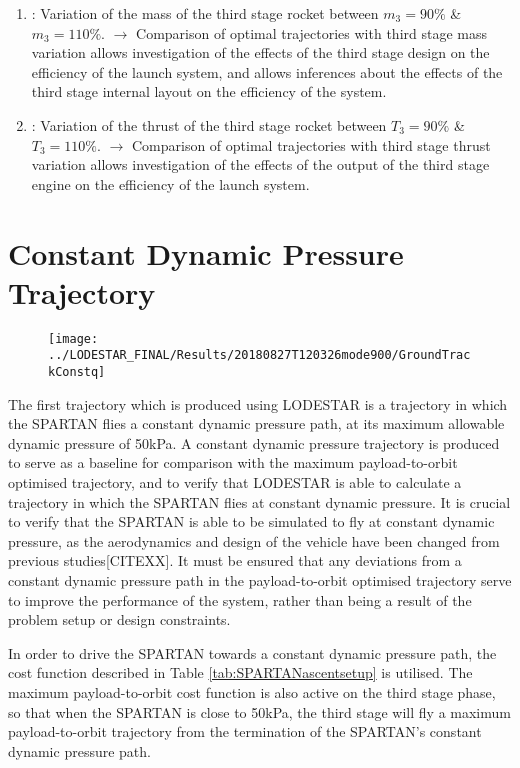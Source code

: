 \begin{enumerate}
	\item: Variation of the mass of the third stage rocket between $m_3 = 90\%$ \& $m_3 = 110\%$. 
	\newline$\rightarrow$ Comparison of optimal trajectories with third stage mass variation allows investigation of the effects of the third stage design on the efficiency of the launch system, and allows inferences about the effects of the third stage internal layout on the efficiency of the system. 
	\item: Variation of the thrust of the third stage rocket between $T_3 = 90\%$ \& $T_3 = 110\%$. 
	\newline$\rightarrow$ Comparison of optimal trajectories with third stage thrust variation allows investigation of the effects of the output of the third stage engine on the efficiency of the launch system. 
\end{enumerate}

\section{Constant Dynamic Pressure Trajectory}
\begin{figure}[ht]
	\centering
	\texttt{[image: ../LODESTAR\_FINAL/Results/20180827T120326mode900/GroundTrackConstq]}
	\caption{}
	\label{fig:GroundTrackConstq}
\end{figure}

The first trajectory which is produced using LODESTAR is a trajectory in which the SPARTAN flies a constant dynamic pressure path, at its maximum allowable dynamic pressure of 50kPa.
A constant dynamic pressure trajectory is produced to serve as a baseline for comparison with the maximum payload-to-orbit optimised trajectory, and to verify that LODESTAR is able to calculate a trajectory in which the SPARTAN flies at constant dynamic pressure. It is crucial to verify that the SPARTAN is able to be simulated to fly at constant dynamic pressure, as the aerodynamics and design of the vehicle have been changed from previous studies[CITEXX]. It must be ensured that any deviations from a constant dynamic pressure path in the payload-to-orbit optimised trajectory serve to improve the performance of the system, rather than being a result of the problem setup or design constraints. 

 In order to drive the SPARTAN towards a constant dynamic pressure path, the cost function described in Table \ref{tab:SPARTANascentsetup} is utilised. The maximum payload-to-orbit cost function is also active on the third stage phase, so that when the SPARTAN is close to 50kPa, the third stage will fly a maximum payload-to-orbit trajectory from the termination of the SPARTAN's constant dynamic pressure path. 

